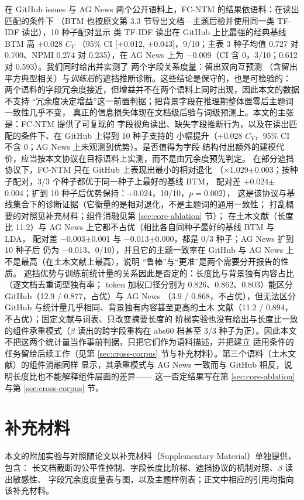 \documentclass[11pt]{ctexart}
\newcommand{\fcntm}{FC-NTM}
\begin{document}
在 GitHub issues 与 AG News 两个公开语料上，\fcntm{} 的结果依语料：在读出匹配的条件下
（BTM 也按原文第 3.3 节导出文档—主题后验并使用同一类 TF-IDF 读出），10 种子配对显示
类 TF-IDF 读出在 GitHub 上比最强的经典基线 BTM 高 $+$0.028 $C_V$
（95\% CI [$+$0.012, $+$0.043]，9/10；主表 3 种子均值 0.727 对 0.700、NPMI 0.274 对
0.235），在 AG News 上为 $-$0.009（CI 含 0，3/10；0.612 对 0.593）。我们同时给出并实测了
两个字段关系度量：留出双向互预测
（含留出平方典型相关）与\emph{训练后}的遮挡推断诊断。这些结论是保守的，也是可检验的：
两个语料的字段冗余度接近，但增益并不在两个语料上同时出现，因此本文的数据不支持
“冗余度决定增益”这一前置判据；把背景字段在推理期整体置零后主题词一致性几乎不变，
真正的信息损失体现在文档级后验与词级预测上。本文的主张是：\fcntm{} 提供了可复现的
字段视角读出、缺失字段推断行为，以及在读出匹配的条件下、在 GitHub 上得到 10 种子支持的
小幅提升（$+$0.028 $C_V$，95\% CI 不含 0；AG News 上未观测到优势）。是否值得为字段
结构付出额外的建模代价，应当按本文协议在目标语料上实测，而不是由冗余度预先判定。
在部分遮挡协议下，\fcntm{} 只在 GitHub 上表现出最小的相对退化
（$\times$1.029$\pm$0.003；按种子配对，3/3 个种子都优于同一种子上最好的基线 BTM，
配对差 $+$0.024$\pm$0.004；扩到 10 种子后优势保持：$+$0.024，10/10，$p=0.002$），
这是该协议与基线集合下的诊断证据（它衡量的是相对退化，不是主题词的通用一致性；
打乱概要的对照见补充材料；组件消融见第 \ref{sec:core-ablation} 节）；
在土木文献（长度比 11.2）与 AG News 上它都不占优（相比各自同种子最好的基线 BTM 与 LDA，
配对差 $-$0.003$\pm$0.001 与 $-$0.013$\pm$0.000，都是 0/3 种子；AG News 扩到 10 种子后
仍为 $-$0.013、0/10），并且它的主题一致率在 GitHub 与 AG News 上不是最高（在土木文献上最高），说明
“鲁棒”与“更准”是两个需要分开报告的性质。
遮挡优势与训练前统计量的关系因此是否定的：长度比与背景独有内容占比（逐文档去重词型独有率；
token 加权口径分别为 0.826、0.862、0.803）能区分 GitHub（12.9 / 0.877，占优）与 AG News
（3.9 / 0.868，不占优），但无法区分 GitHub 与统计量几乎相同、背景独有内容甚至更高的土木
文献（11.2 / 0.894，不占优）；固定文献与词表、只改变摘要长度的
阶梯实验也没有给出与长度比一致的组件承重模式（$\beta$ 读出的跨字段重构在 abs60 档甚至
3/3 种子为正）。因此本文不把这两个统计量当作事前判据，只把它们作为语料描述，并把建立
适用条件的任务留给后续工作（见第 \ref{sec:cross-corpus} 节与补充材料）。第三个语料（土木文献）的组件消融同样
显示，其承重模式与 AG News 一致而与 GitHub 相反，说明长度比也不能解释组件层面的差异——
这一否定结果写在第 \ref{sec:core-ablation} 与第 \ref{sec:cross-corpus} 节。

\section*{补充材料}
本文的附加实验与对照随论文以补充材料（Supplementary Material）单独提供，包含：
长文档截断的公平性控制、字段长度比阶梯、遮挡协议的机制对照、$\beta$ 读出敏感性、
字段冗余度度量表与图，以及主题样例表；正文中相应的引用均指向该补充材料。
\end{document}
